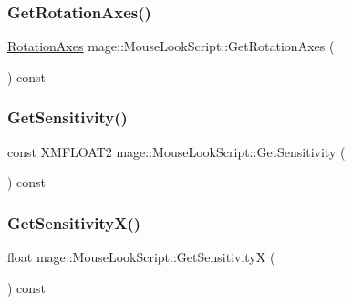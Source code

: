 \subsubsection{\texorpdfstring{Get\+Rotation\+Axes()}{GetRotationAxes()}}
{\footnotesize\ttfamily \hyperlink{namespacemage_a548e5c31b08a1078841ed21948f5bf4c}{Rotation\+Axes} mage\+::\+Mouse\+Look\+Script\+::\+Get\+Rotation\+Axes (\begin{DoxyParamCaption}{ }\end{DoxyParamCaption}) const}

\hypertarget{classmage_1_1_mouse_look_script_a942a751f1b6ed77bf2562b4f17dc108c}{}\label{classmage_1_1_mouse_look_script_a942a751f1b6ed77bf2562b4f17dc108c} 
\subsubsection{\texorpdfstring{Get\+Sensitivity()}{GetSensitivity()}}
{\footnotesize\ttfamily const X\+M\+F\+L\+O\+A\+T2 mage\+::\+Mouse\+Look\+Script\+::\+Get\+Sensitivity (\begin{DoxyParamCaption}{ }\end{DoxyParamCaption}) const}

\hypertarget{classmage_1_1_mouse_look_script_a5ba6c96a6d73050bc0c9903f376dbd93}{}\label{classmage_1_1_mouse_look_script_a5ba6c96a6d73050bc0c9903f376dbd93} 
\subsubsection{\texorpdfstring{Get\+Sensitivity\+X()}{GetSensitivityX()}}
{\footnotesize\ttfamily float mage\+::\+Mouse\+Look\+Script\+::\+Get\+SensitivityX (\begin{DoxyParamCaption}{ }\end{DoxyParamCaption}) const}

\hypertarget{classmage_1_1_mouse_look_script_a154e0de56755e927ee0731a6f3159e55}{}\label{classmage_1_1_mouse_look_script_a154e0de56755e927ee0731a6f3159e55} 
